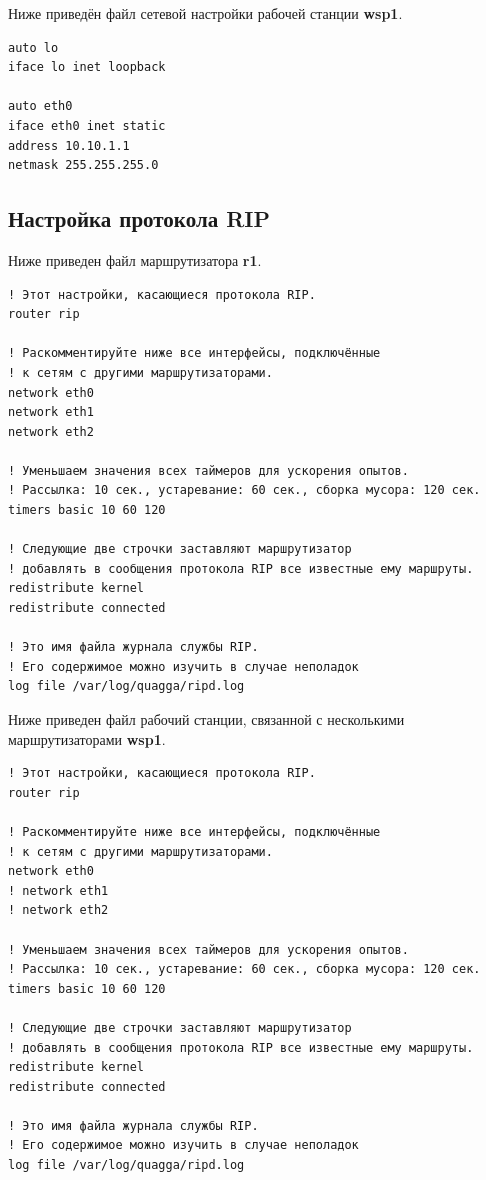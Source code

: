 \documentclass[a4paper,12pt]{article}
\begin{document}
Ниже приведён файл сетевой настройки рабочей станции \textbf{wsp1}.

\begin{Verbatim}
auto lo
iface lo inet loopback

auto eth0
iface eth0 inet static
address 10.10.1.1
netmask 255.255.255.0
\end{Verbatim}


\subsection{Настройка протокола RIP}

Ниже приведен файл  маршрутизатора \textbf{r1}.

\begin{Verbatim}
! Этот настройки, касающиеся протокола RIP.
router rip

! Раскомментируйте ниже все интерфейсы, подключённые
! к сетям с другими маршрутизаторами.
network eth0
network eth1
network eth2

! Уменьшаем значения всех таймеров для ускорения опытов.
! Рассылка: 10 сек., устаревание: 60 cек., сборка мусора: 120 сек.
timers basic 10 60 120

! Следующие две строчки заставляют маршрутизатор
! добавлять в сообщения протокола RIP все известные ему маршруты.
redistribute kernel
redistribute connected

! Это имя файла журнала службы RIP.
! Его содержимое можно изучить в случае неполадок
log file /var/log/quagga/ripd.log
\end{Verbatim}


Ниже приведен файл  рабочий станции, связанной с несколькими маршрутизаторами \textbf{wsp1}.

\begin{Verbatim}
! Этот настройки, касающиеся протокола RIP.
router rip

! Раскомментируйте ниже все интерфейсы, подключённые
! к сетям с другими маршрутизаторами.
network eth0
! network eth1
! network eth2

! Уменьшаем значения всех таймеров для ускорения опытов.
! Рассылка: 10 сек., устаревание: 60 cек., сборка мусора: 120 сек.
timers basic 10 60 120

! Следующие две строчки заставляют маршрутизатор
! добавлять в сообщения протокола RIP все известные ему маршруты.
redistribute kernel
redistribute connected

! Это имя файла журнала службы RIP.
! Его содержимое можно изучить в случае неполадок
log file /var/log/quagga/ripd.log
\end{Verbatim}
\end{document}
